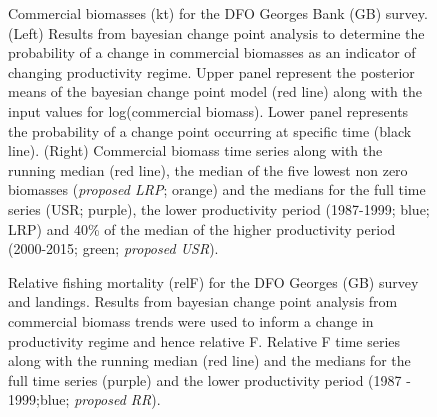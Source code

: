 \documentclass[11pt]{article}
\newcommand{\e}{/backup/bio_data/bio.lobster/figures/} %
\begin{document}
\begin{landscape}
\begin{figure}
\centering
       \caption{Commercial biomasses (kt) for the DFO Georges Bank (GB) survey. (Left) Results from bayesian change point analysis to determine the probability of a change in commercial biomasses as an indicator of changing productivity regime. Upper panel represent the posterior means of the bayesian change point model (red line) along with the input values for log(commercial biomass). Lower panel represents the probability of a change point occurring at specific time (black line). (Right) Commercial biomass time series along with the running median (red line), the median of the five lowest non zero biomasses (\emph{proposed LRP}; orange) and the medians for the full time series (USR; purple), the lower productivity period (1987-1999; blue; LRP) and 40\% of the median of the higher productivity period (2000-2015; green; \emph{proposed USR}). }

\end{figure}
\end{landscape}
     \clearpage

\begin{figure}
\centering
       \caption{Relative fishing mortality (relF) for the DFO Georges (GB) survey and landings. Results from bayesian change point analysis from commercial biomass trends were used to inform a change in productivity regime and hence relative F. Relative F time series along with the running median (red line) and the medians for the full time series (purple) and the lower productivity period (1987 - 1999;blue; \emph{proposed RR}). }
\end{figure}
     \clearpage
\end{document}
